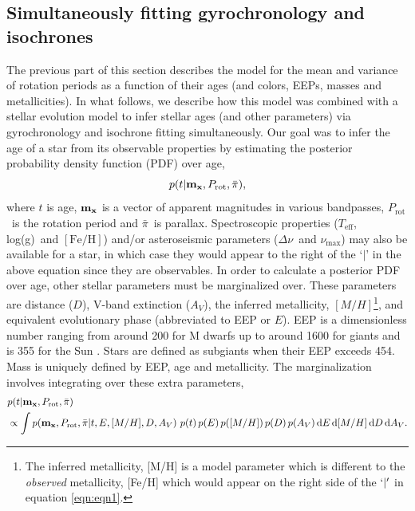 \documentclass[useAMS, usenatbib, preprint, 12pt]{aastex}
\newcommand{\teff}{$T_{\mathrm{eff}}$}
\newcommand{\prot}{$P_{\mathrm{rot}}$}
\newcommand{\pmega}{$\bar{\pi}$}
\newcommand{\logg}{log(g)}
\newcommand{\dnu}{$\Delta \nu$}
\newcommand{\numax}{$\nu_{\mathrm{max}}$}
\begin{document}
\subsection{Simultaneously fitting gyrochronology and isochrones}
The previous part of this section describes the model for the mean and
variance of rotation periods as a function of their ages (and colors, EEPs,
masses and metallicities).
In what follows, we describe how this model was combined with a stellar
evolution model to infer stellar ages (and other parameters) via
gyrochronology and isochrone fitting simultaneously.
Our goal was to infer the age of a star from its observable properties by
estimating the posterior probability density function (PDF) over age,
\begin{equation} \label{eqn:eqn1}
    p(t|{\bf m_x}, P_{\mathrm{rot}}, \bar{\pi}),
\end{equation}
where $t$ is age, ${\bf m_x}$ is a vector of
apparent magnitudes in various bandpasses,
\prot\ is the rotation period and \pmega\ is parallax.
Spectroscopic properties (\teff, \logg\ and $\mathrm{[Fe/H]}$) and/or
asteroseismic parameters (\dnu\ and \numax) may also be available for a star,
in which case they would appear to the right of the `$|$' in the above
equation since they are observables.
In order to calculate a posterior PDF over age, other stellar parameters must
be marginalized over.
These parameters are distance ($D$), V-band extinction ($A_V$), the
inferred metallicity, $[M/H]$\footnote{The inferred metallicity, [M/H] is a
model parameter which is different to the {\it observed} metallicity, [Fe/H]
which would appear on the right side of the $`|'$ in equation \ref{eqn:eqn1}.},
and equivalent evolutionary phase (abbreviated to EEP or
$E$).
EEP is a dimensionless number ranging from around 200 for M dwarfs up
to around 1600 for giants and is 355 for the Sun \citep[see][]{dotter2016,
choi2016}.
Stars are defined as subgiants when their EEP exceeds 454.
Mass is uniquely defined by EEP, age and metallicity.
The marginalization involves integrating over these extra parameters,
\begin{eqnarray} \label{eqn:bayes}
    & p(t|{\bf m_x},
    P_{\mathrm{rot}}, \bar{\pi})
\\ \nonumber
    & \propto \int p({\bf m_x},
    P_\mathrm{rot}, \bar{\pi}|
    t, E, [M/H], D, A_V)~p(t)\, p(E)\, p([M/H])\, p(D)\, p(A_V)\, \mathrm{d}E\,
    \mathrm{d}[M/H]\, \mathrm{d}D\, \mathrm{d}A_V.
\end{eqnarray}
\end{document}
